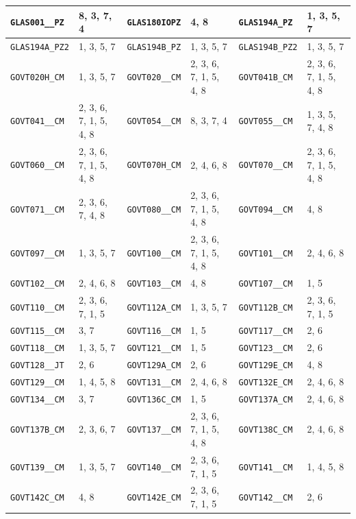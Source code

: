 \begin{longtable}{|l|l||l|l||l|l|}
    \verb|GLAS001__PZ| & 8, 3, 7, 4 & \verb|GLAS180IOPZ| & 4, 8 & \verb|GLAS194A_PZ| & 1, 3, 5, 7\\\hline
    \verb|GLAS194A_PZ2| & 1, 3, 5, 7 & \verb|GLAS194B_PZ| & 1, 3, 5, 7 & \verb|GLAS194B_PZ2| & 1, 3, 5, 7\\\hline
    \verb|GOVT020H_CM| & 1, 3, 5, 7 & \verb|GOVT020__CM| & 2, 3, 6, 7, 1, 5, 4, 8 & \verb|GOVT041B_CM| & 2, 3, 6, 7, 1, 5, 4, 8\\\hline
    \verb|GOVT041__CM| & 2, 3, 6, 7, 1, 5, 4, 8 & \verb|GOVT054__CM| & 8, 3, 7, 4 & \verb|GOVT055__CM| & 1, 3, 5, 7, 4, 8\\\hline
    \verb|GOVT060__CM| & 2, 3, 6, 7, 1, 5, 4, 8 & \verb|GOVT070H_CM| & 2, 4, 6, 8 & \verb|GOVT070__CM| & 2, 3, 6, 7, 1, 5, 4, 8\\\hline
    \verb|GOVT071__CM| & 2, 3, 6, 7, 4, 8 & \verb|GOVT080__CM| & 2, 3, 6, 7, 1, 5, 4, 8 & \verb|GOVT094__CM| & 4, 8\\\hline
    \verb|GOVT097__CM| & 1, 3, 5, 7 & \verb|GOVT100__CM| & 2, 3, 6, 7, 1, 5, 4, 8 & \verb|GOVT101__CM| & 2, 4, 6, 8\\\hline
    \verb|GOVT102__CM| & 2, 4, 6, 8 & \verb|GOVT103__CM| & 4, 8 & \verb|GOVT107__CM| & 1, 5\\\hline
    \verb|GOVT110__CM| & 2, 3, 6, 7, 1, 5 & \verb|GOVT112A_CM| & 1, 3, 5, 7 & \verb|GOVT112B_CM| & 2, 3, 6, 7, 1, 5\\\hline
    \verb|GOVT115__CM| & 3, 7 & \verb|GOVT116__CM| & 1, 5 & \verb|GOVT117__CM| & 2, 6\\\hline
    \verb|GOVT118__CM| & 1, 3, 5, 7 & \verb|GOVT121__CM| & 1, 5 & \verb|GOVT123__CM| & 2, 6\\\hline
    \verb|GOVT128__JT| & 2, 6 & \verb|GOVT129A_CM| & 2, 6 & \verb|GOVT129E_CM| & 4, 8\\\hline
    \verb|GOVT129__CM| & 1, 4, 5, 8 & \verb|GOVT131__CM| & 2, 4, 6, 8 & \verb|GOVT132E_CM| & 2, 4, 6, 8\\\hline
    \verb|GOVT134__CM| & 3, 7 & \verb|GOVT136C_CM| & 1, 5 & \verb|GOVT137A_CM| & 2, 4, 6, 8\\\hline
    \verb|GOVT137B_CM| & 2, 3, 6, 7 & \verb|GOVT137__CM| & 2, 3, 6, 7, 1, 5, 4, 8 & \verb|GOVT138C_CM| & 2, 4, 6, 8\\\hline
    \verb|GOVT139__CM| & 1, 3, 5, 7 & \verb|GOVT140__CM| & 2, 3, 6, 7, 1, 5 & \verb|GOVT141__CM| & 1, 4, 5, 8\\\hline
    \verb|GOVT142C_CM| & 4, 8 & \verb|GOVT142E_CM| & 2, 3, 6, 7, 1, 5 & \verb|GOVT142__CM| & 2, 6\\\hline

\end{longtable}
